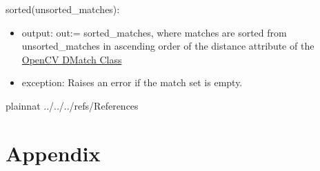 \documentclass[12pt, titlepage]{article}
\begin{document}
\noindent sorted(unsorted\_matches): 
\begin{itemize} 
  \item output: out:= sorted\_matches, where matches are sorted from unsorted\_matches 
  in ascending order of the distance attribute of the 
  \href{https://docs.opencv.org/3.4/d4/de0/classcv_1_1DMatch.html}{OpenCV DMatch Class}
  \item exception: Raises an error if the match set is empty. 
\end{itemize}


\newpage

 {plainnat}
 {../../../refs/References}

\newpage

\section{Appendix} \label{Appendix}
\end{document}
